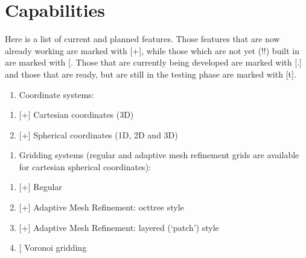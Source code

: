 \documentclass[letterpaper,10pt,english]{sphinxmanual}
\begin{document}
\section{Capabilities}
\label{\detokenize{introduction:capabilities}}
Here is a list of current and planned features. Those features that are now
already working are marked with {[}+{]}, while those which are not yet (!!) built in
are marked with {[}\sphinxhyphen{}{]}. Those that are currently being developed are marked with
{[}.{]} and those that are ready, but are still in the testing phase are marked with
{[}t{]}.
\begin{enumerate}
%
\item {} 
Coordinate systems:

\end{enumerate}
\begin{enumerate}
%
\item {} 
{[}+{]} Cartesian coordinates (3\sphinxhyphen{}D)

\item {} 
{[}+{]} Spherical coordinates (1\sphinxhyphen{}D, 2\sphinxhyphen{}D and 3\sphinxhyphen{}D)

\end{enumerate}
\begin{enumerate}
%
\item {} 
Gridding systems (regular and adaptive mesh refinement grids are
available for cartesian  spherical coordinates):

\end{enumerate}
\begin{enumerate}
%
\item {} 
{[}+{]} Regular

\item {} 
{[}+{]} Adaptive Mesh Refinement: oct\sphinxhyphen{}tree style

\item {} 
{[}+{]} Adaptive Mesh Refinement: layered (‘patch’) style

\item {} 
{[}\sphinxhyphen{}{]} Voronoi gridding 

\end{enumerate}
\end{document}
